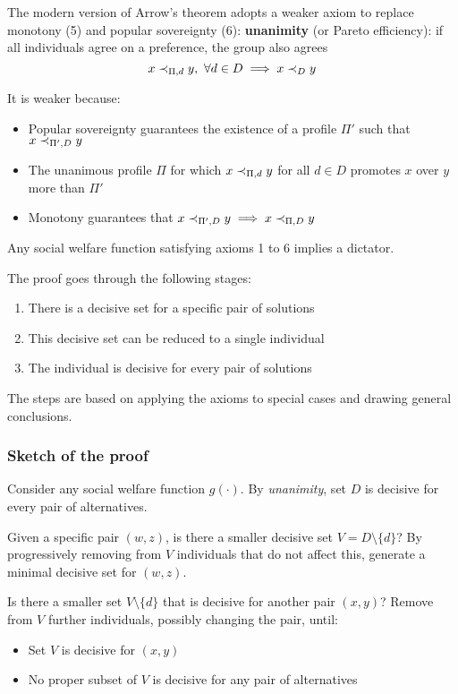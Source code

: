 The modern version of Arrow's theorem adopts a weaker axiom to replace monotony (5) and popular sovereignty (6): \textbf{unanimity} (or Pareto efficiency): if all individuals agree on a preference, the group also agrees
$$ x \prec_{\Pi, d} y, \ \forall d \in D \implies x \prec_{D} y $$

It is weaker because: 
\begin{itemize}
	\item Popular sovereignty guarantees the existence of a profile $\Pi'$ such that $x \prec_{\Pi', D} y$
	
	\item The unanimous profile $\Pi$ for which $x \prec_{\Pi, d} y$ for all $d \in D$ promotes $x$ over $y$ more than $\Pi'$
	
	\item Monotony guarantees that $x \prec_{\Pi', D} y \implies x \prec_{\Pi, D} y$ 
\end{itemize}

\begin{theo}
	Any social welfare function satisfying axioms 1 to 6 implies a dictator.
\end{theo}

The proof goes through the following stages: 
\begin{enumerate}
	\item There is a decisive set for a specific pair of solutions
	
	\item This decisive set can be reduced to a single individual
	
	\item The individual is decisive for every pair of solutions
\end{enumerate}
The steps are based on applying the axioms to special cases and drawing general conclusions.

\subsubsection{Sketch of the proof}

Consider any social welfare function $g(\cdot)$. By \textit{unanimity}, set $D$ is decisive for every pair of alternatives.

Given a specific pair $(w, z)$, is there a smaller decisive set $V = D \setminus \{d\}$? By progressively removing from $V$ individuals that do not affect this, generate a minimal decisive set for $(w, z)$.

Is there a smaller set $V \setminus \{d\}$ that is decisive for another pair $(x,y)$? Remove from $V$ further individuals, possibly changing the pair, until: 
\begin{itemize}
	\item Set $V$ is decisive for $(x,y)$
	
	\item No proper subset of $V$ is decisive for any pair of alternatives
\end{itemize}

